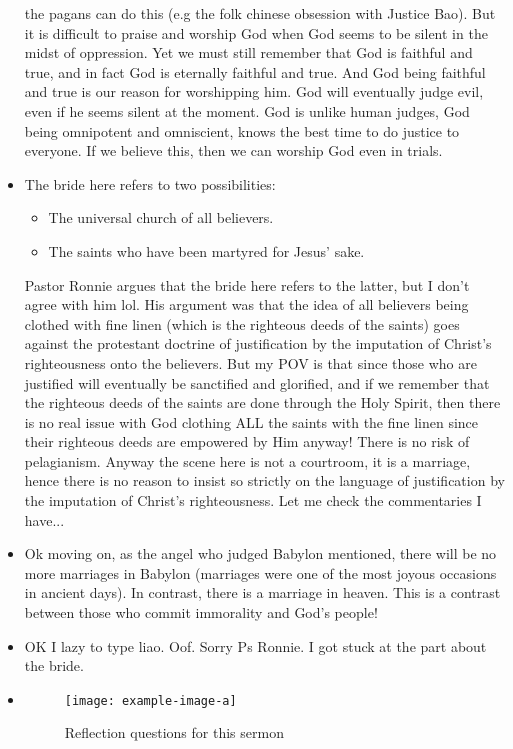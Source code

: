\begin{itemize}
{  the pagans can do this (e.g the folk chinese obsession with Justice Bao).
  But it is difficult to praise and worship God when God seems to be silent
  in the midst of oppression.  Yet we must still remember that God is
  faithful and true, and in fact God is eternally faithful and true.  And God
  being faithful and true is our reason for worshipping him.  God will
  eventually judge evil, even if he seems silent at the moment.  God is
  unlike human judges, God being omnipotent and omniscient, knows the best
  time to do justice to everyone.  If we believe this, then we can worship
  God even in trials.}
  \item{The bride here refers to two possibilities:
  \begin{itemize}
    \item{The universal church of all believers.}
    \item{The saints who have been martyred for Jesus' sake.}
  \end{itemize}
  Pastor Ronnie argues that the bride here refers to the latter, but I don't
  agree with him lol.  His argument was that the idea of all believers being
  clothed with fine linen (which is the righteous deeds of the saints) goes
  against the protestant doctrine of justification by the imputation of
  Christ's righteousness onto the believers.  But my POV is that since those
  who are justified will eventually be sanctified and glorified, and if we
  remember that the righteous deeds of the saints are done through the Holy
  Spirit, then there is no real issue with God clothing ALL the saints with
  the fine linen since their righteous deeds are empowered by Him anyway!
  There is no risk of pelagianism.  Anyway the scene here is not a
  courtroom, it is a marriage, hence there is no reason to insist so strictly
  on the language of justification by the imputation of Christ's
  righteousness.  Let me check the commentaries I have...}
  \item{Ok moving on, as the angel who judged Babylon mentioned, there will
  be no more marriages in Babylon (marriages were one of the most joyous
  occasions in ancient days).  In contrast, there is a marriage in heaven.
  This is a contrast between those who commit immorality and God's people!}
  \item{OK I lazy to type liao. Oof. Sorry Ps Ronnie. I got stuck at the part about the bride.}
  \item{\begin{figure}[H]
    \centering
    \texttt{[image: example-image-a]}
    \caption[]{Reflection questions for this sermon}
    \label{}
  \end{figure}}
\end{itemize}